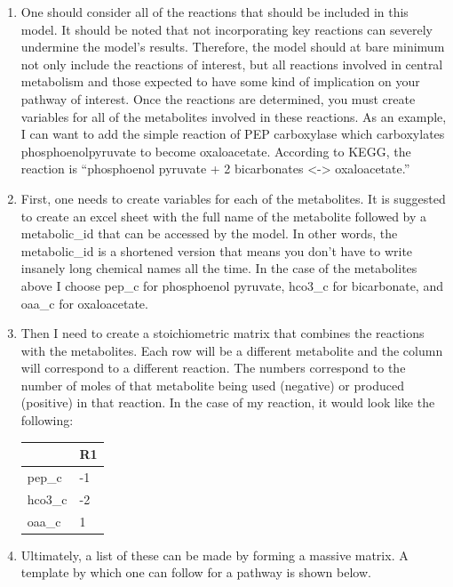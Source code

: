 \begin{enumerate}
    \item  One should consider all of the reactions that should be included in this model. It should be noted that not incorporating key reactions can severely undermine the model’s results. Therefore, the model should at bare minimum not only include the reactions of interest, but all reactions involved in central metabolism and those expected to have some kind of implication on your pathway of interest. Once the reactions are determined, you must create variables for all of the metabolites involved in these reactions. As an example, I can want to add the simple reaction of PEP carboxylase which carboxylates phosphoenolpyruvate to become oxaloacetate. According to KEGG, the reaction is “phosphoenol pyruvate + 2 bicarbonates <-> oxaloacetate.”
    \item First, one needs to create variables for each of the metabolites. It is suggested to create an excel sheet with the full name of the metabolite followed by a metabolic\_id that can be accessed by the model. In other words, the metabolic\_id is a shortened version that means you don’t have to write insanely long chemical names all the time. In the case of the metabolites above I choose pep\_c for phosphoenol pyruvate, hco3\_c for bicarbonate, and oaa\_c for oxaloacetate.
    \item Then I need to create a stoichiometric matrix that combines the reactions with the metabolites. Each row will be a different metabolite and the column will correspond to a different reaction. The numbers correspond to the number of moles of that metabolite being used (negative) or produced (positive) in that reaction. In the case of my reaction, it would look like the following:
\begin{table}[!htpb]
\centering
\begin{tabular}{|l|l|} 
\hline
        & R1  \\ 
\hline
pep\_c  & -1  \\
hco3\_c & -2  \\
oaa\_c  & 1   \\
\hline
\end{tabular}
\end{table}
\FloatBarrier

    \item Ultimately, a list of these can be made by forming a massive matrix. A template by which one can follow for a pathway is shown below.
    

\end{enumerate}
